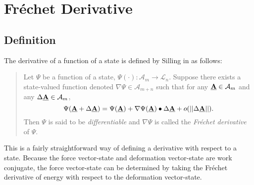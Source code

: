 \documentclass[preprint,review,12pt]{elsarticle}
\newcommand\vstate[3]{%
	\mathbf{\underline{#1}}%
	\ifstrempty{#2}{}{[#2]}%
	\ifstrempty{#3}{}{\langle #3 \rangle}}
\begin{document}
\appendix
\section{Fr\'echet Derivative}
\label{sec:frechet}
\subsection{Definition}
The derivative of a function of a state is defined by Silling in \cite{silling2007peridynamic} as follows:
\begin{quote}
Let $\Psi$ be a function of a state, $\Psi(\cdot):\mathcal{A}_m\rightarrow\mathcal{L}_n$. Suppose there exists a state-valued function denoted $\nabla\Psi\in\mathcal{A}_{m+n}$ such that for any $\vstate{A}{}{}\in\mathcal{A}_m$ and any $\Delta\vstate{A}{}{}\in\mathcal{A}_m$,
\begin{equation}
  \Psi(\vstate{A}{}{}+\Delta\vstate{A}{}{})=\Psi(\vstate{A}{}{})+\nabla\Psi(\vstate{A}{}{})\bullet\Delta\vstate{A}{}{}+o(||\Delta\vstate{A}{}{}||).
\end{equation}
Then $\Psi$ is said to be \textit{differentiable} and $\nabla\Psi$ is called the \textit{Fr\'echet derivative} of $\Psi$.
\end{quote}
This is a fairly straightforward way of defining a derivative with respect to a state.
Because the force vector-state and deformation vector-state are work conjugate, the force vector-state can be determined by taking the Fr\'echet derivative of energy with respect to the deformation vector-state.
\end{document}
